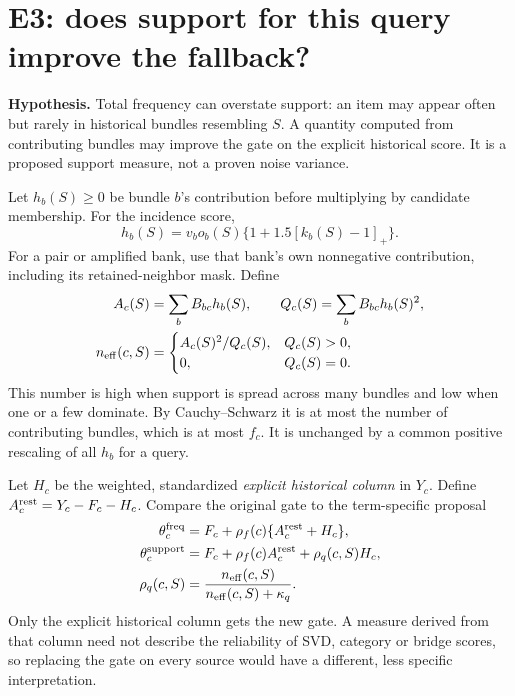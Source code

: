 \documentclass[11pt,a4paper]{article}
\begin{document}
\section{E3: does support for this query improve the fallback?}
\label{sec:e3}

\textbf{Hypothesis.} Total frequency can overstate support: an item may
appear often but rarely in historical bundles resembling $S$. A quantity
computed from contributing bundles may improve the gate on the explicit
historical score. It is a proposed support measure, not a proven noise variance.

Let $h_b(S)\geq0$ be bundle $b$'s contribution before multiplying by
candidate membership. For the incidence score,
\begin{equation}
 h_b(S)=v_bo_b(S)\{1+1.5[k_b(S)-1]_+\}.
\end{equation}
For a pair or amplified bank, use that bank's own nonnegative contribution,
including its retained-neighbor mask. Define
\begin{align}
 A_c(S)&=\sum_b B_{bc}h_b(S),\qquad
 Q_c(S)=\sum_b B_{bc}h_b(S)^2,\notag\\
 n_{\rm eff}(c,S)&=
 \begin{cases}A_c(S)^2/Q_c(S),&Q_c(S)>0,\\0,&Q_c(S)=0.\end{cases}
 \label{eq:ess}
\end{align}
This number is high when support is spread across many bundles and low
when one or a few dominate. By Cauchy--Schwarz it is at most the number
of contributing bundles, which is at most $f_c$. It is unchanged by a
common positive rescaling of all $h_b$ for a query.

Let $H_c$ be the weighted, standardized \emph{explicit historical column}
in $Y_c$. Define $A^{\rm rest}_c=Y_c-F_c-H_c$. Compare the original
gate to the term-specific proposal
\begin{align}
 \theta^{\rm freq}_c
   &=F_c+\rho_f(c)\{A^{\rm rest}_c+H_c\},\notag\\
 \theta^{\rm support}_c
   &=F_c+\rho_f(c)A^{\rm rest}_c
          +\rho_q(c,S)H_c,\notag\\
 \rho_q(c,S)&=\frac{n_{\rm eff}(c,S)}{n_{\rm eff}(c,S)+\kappa_q}.
 \label{eq:supportgate}
\end{align}
Only the explicit historical column gets the new gate. A measure derived
from that column need not describe the reliability of SVD, category or
bridge scores, so replacing the gate on every source would have a different,
less specific interpretation.
\end{document}
